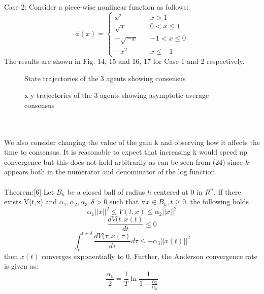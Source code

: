 \documentclass[journal]{IEEEtran}
\begin{document}
\\\\Case 2: Consider a piece-wise nonlinear function as follows:
\[ \phi(x) = \begin{cases} 
     x^2  \quad & x > 1 \\
      \sqrt{x} \quad &  0 < x \leq 1 \\
   -\sqrt{-x} \quad & -1 < x \leq 0 \\
   -x^2	\quad & x \leq -1
   \end{cases}\]  
The results are shown in Fig. 14, 15 and 16, 17 for Case 1 and 2 respectively.
\begin{figure}[h]
\caption{State trajectories of the 3 agents showing consensus} \end{figure}
\begin{figure}[h]
\caption{x-y trajectories of the 3 agents showing asymptotic average consensus} \end{figure}
\\\\We also consider changing the value of the gain k and observing how it affects the time to consensus. It is reasonable to expect that increasing k would speed up convergence but this does not hold arbitrarily as can be seen from (24) since $k$ appears both in the numerator and denominator of the log function. \\\\Theorem:[6] Let $B_h$ be a closed ball of radius $h$ centered at 0 in $R^n$. If there exists V(t,x) and $\alpha_1,\alpha_2,\alpha_3,\delta > 0$ such that $\forall x \in B_h, t\geq 0$, the following holds $$\alpha_1||x||^2 \leq V(t,x) \leq \alpha_2||x||^2$$$$\frac{dV(t,x(t)}{dt} \leq 0$$$$\int_{t}^{t+\delta}\frac{dV(\tau,x(\tau)}{d\tau}d\tau \leq -\alpha_3||x(t)||^2$$ then $x(t)$ converges exponentially to 0. Further, the Anderson convergence rate is given as:$$\frac{\alpha_v}{2} = \frac{1}{T}\ln\frac{1}{1-\frac{\alpha_3}{\alpha_2}}$$
\end{document}
